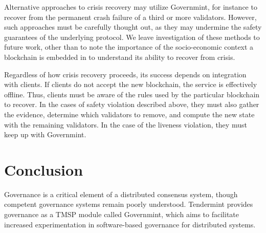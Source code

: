 Alternative approaches to crisis recovery may utilize Governmint, 
for instance to recover from the permanent crash failure of a third or more validators.
However, such approaches must be carefully thought out, 
as they may undermine the safety guarantees of the underlying protocol.
We leave investigation of these methods to future work, 
other than to note the importance of the socio-economic context a blockchain is embedded in to understand its ability to recover from crisis.

Regardless of how crisis recovery proceeds, its success depends on integration with clients.
If clients do not accept the new blockchain, the service is effectively offline.
Thus, clients must be aware of the rules used by the particular blockchain to recover.
In the cases of safety violation described above, they must also gather the evidence,
determine which validators to remove, and compute the new state with the remaining validators.
In the case of the liveness violation, they must keep up with Governmint.

\section{Conclusion}

Governance is a critical element of a distributed consensus system, 
though competent governance systems remain poorly understood.
Tendermint provides governance as a TMSP module called Governmint,
which aims to facilitate increased experimentation in software-based governance for distributed systems.

